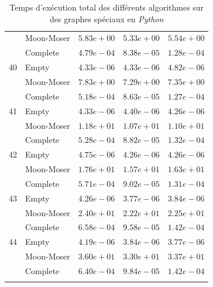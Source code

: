 \documentclass[12pt,a4paper]{article}
\begin{document}
\begin{longtable}{|l||l|l|l|l|}
  & Moon-Moser & $5.83e+00$ & $5.33e+00$ & $5.54e+00$ \\
  & Complete & $4.79e-04$ & $8.38e-05$ & $1.28e-04$ \\
  \hline
  40 & Empty & $4.33e-06$ & $4.33e-06$ & $4.82e-06$ \\
  & Moon-Moser & $7.83e+00$ & $7.29e+00$ & $7.35e+00$ \\
  & Complete & $5.18e-04$ & $8.63e-05$ & $1.27e-04$ \\
  \hline
  41 & Empty & $4.33e-06$ & $4.40e-06$ & $4.26e-06$ \\
  & Moon-Moser & $1.18e+01$ & $1.07e+01$ & $1.10e+01$ \\
  & Complete & $5.28e-04$ & $8.82e-05$ & $1.32e-04$ \\
  \hline
  42 & Empty & $4.75e-06$ & $4.26e-06$ & $4.26e-06$ \\
  & Moon-Moser & $1.76e+01$ & $1.57e+01$ & $1.63e+01$ \\
  & Complete & $5.71e-04$ & $9.02e-05$ & $1.31e-04$ \\
  \hline
  43 & Empty & $4.26e-06$ & $3.77e-06$ & $3.84e-06$ \\
  & Moon-Moser & $2.40e+01$ & $2.22e+01$ & $2.25e+01$ \\
  & Complete & $6.58e-04$ & $9.58e-05$ & $1.42e-04$ \\
  \hline
  44 & Empty & $4.19e-06$ & $3.84e-06$ & $3.77e-06$ \\
  & Moon-Moser & $3.60e+01$ & $3.30e+01$ & $3.37e+01$ \\
  & Complete & $6.40e-04$ & $9.84e-05$ & $1.42e-04$ \\
  \hline
  \caption{Temps d'exécution total des différents algorithmes sur des graphes spéciaux en \emph{Python}}
\end{longtable}
\end{document}
